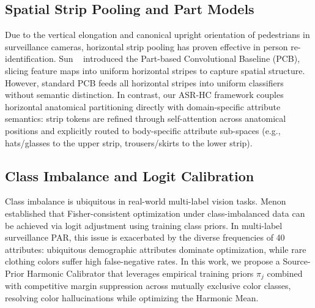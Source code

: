 \subsection{Spatial Strip Pooling and Part Models}
Due to the vertical elongation and canonical upright orientation of pedestrians in surveillance cameras, horizontal strip pooling has proven effective in person re-identification. Sun \etal~\cite{sun2018beyond} introduced the Part-based Convolutional Baseline (PCB), slicing feature maps into uniform horizontal stripes to capture spatial structure. However, standard PCB feeds all horizontal stripes into uniform classifiers without semantic distinction. In contrast, our ASR-HC framework couples horizontal anatomical partitioning directly with domain-specific attribute semantics: strip tokens are refined through self-attention across anatomical positions and explicitly routed to body-specific attribute sub-spaces (e.g., hats/glasses to the upper strip, trousers/skirts to the lower strip).

\subsection{Class Imbalance and Logit Calibration}
Class imbalance is ubiquitous in real-world multi-label vision tasks. Menon \etal~\cite{menon2021longtail} established that Fisher-consistent optimization under class-imbalanced data can be achieved via logit adjustment using training class priors. In multi-label surveillance PAR, this issue is exacerbated by the diverse frequencies of 40 attributes: ubiquitous demographic attributes dominate optimization, while rare clothing colors suffer high false-negative rates. In this work, we propose a Source-Prior Harmonic Calibrator that leverages empirical training priors $\pi_j$ combined with competitive margin suppression across mutually exclusive color classes, resolving color hallucinations while optimizing the Harmonic Mean.
